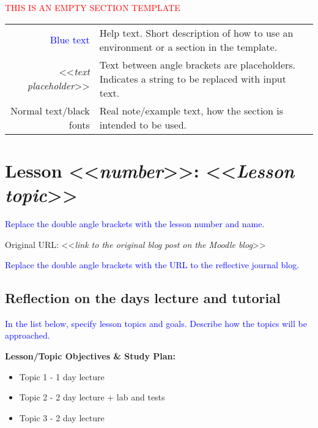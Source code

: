 

{\begin{center}
    \textcolor{red}{\Huge{THIS IS AN EMPTY SECTION TEMPLATE}}

    \begin{tabular}{r @{: } p{80mm}}
        {\textcolor{blue}{Blue text}} &  Help text. Short description of how to use an environment or a section in the template.\\
        <<{\emph{text placeholder}}>> & Text between angle brackets are placeholders. Indicates a string to be replaced with input text.\\
        Normal text/black fonts & Real note/example text, how the section is intended to be used.
    \end{tabular}

\end{center}


\section{Lesson <<{\emph{number}}>>: <<{\emph{Lesson topic}}>>}

{\textcolor{blue}{Replace the double angle brackets with the lesson number and name.}}

Original URL: <<{\emph{link to the original blog post on the Moodle blog}}>>

{\textcolor{blue}{Replace the double angle brackets with the URL to the reflective journal blog.}}


\subsection{Reflection on the days lecture and tutorial}

{\textcolor{blue}{In the list below, specify lesson topics and goals. Describe how the topics will be approached.}}

{\bfseries{Lesson/Topic Objectives \& Study Plan:}}
\begin{itemize}
    \item Topic 1 - 1 day lecture
    \item Topic 2 - 2 day lecture + lab and tests
    \item Topic 3 - 2 day lecture
\end{itemize}

}
